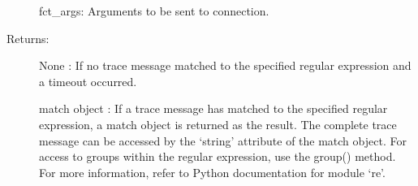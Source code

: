 \documentclass[letterpaper,10pt,english]{sphinxmanual}
\begin{document}
\begin{fulllineitems}
\begin{fulllineitems}
\begin{description}
\sphinxAtStartPar
fct\_args: Arguments to be sent to connection.

\item[{Returns:}] \leavevmode
\sphinxAtStartPar
None :    If no trace message matched to the specified regular expression and a timeout occurred.

\sphinxAtStartPar
match object : If a trace message has matched to the specified regular expression, a match object is returned as the result.                         The complete trace message can be accessed by the ‘string’ attribute of the match object.                         For access to groups within the regular expression, use the group() method.                         For more information, refer to Python documentation for module ‘re’.

\end{description}

\end{fulllineitems}


\end{fulllineitems}

\label{\detokenize{QConnectionLibrary:module-QConnectionLibrary.qlogger}}
\end{document}

